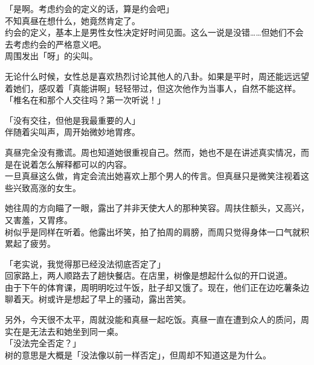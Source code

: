 「是啊。考虑约会的定义的话，算是约会吧」\\

不知真昼在想什么，她竟然肯定了。\\

约会的定义，基本上是男性女性决定好时间见面。这么一说是没错……但她们不会去考虑约会的严格意义吧。\\

周围发出「呀」的尖叫。

无论什么时候，女性总是喜欢热烈讨论其他人的八卦。如果是平时，周还能远远望着她们，感叹着「真能讲啊」轻轻带过，但这次他作为当事人，自然不能这样。\\

「椎名在和那个人交往吗？第一次听说！」

「没有交往，但他是我最重要的人」\\

伴随着尖叫声，周开始微妙地胃疼。

真昼完全没有撒谎。周也知道她很重视自己。然而，她也不是在讲述真实情况，而是在说着怎么解释都可以的内容。\\

一旦真昼这么做，肯定会流出她喜欢上那个男人的传言。但真昼只是微笑注视着这些兴致高涨的女生。

她往周的方向瞄了一眼，露出了并非天使大人的那种笑容。周扶住额头，又高兴，又害羞，又胃疼。\\

树似乎是同样在听着。他露出坏笑，拍了拍周的肩膀，而周只觉得身体一口气就积累起了疲劳。\\

\vspace{2\baselineskip}

「老实说，我觉得那已经没法彻底否定了」\\

回家路上，两人顺路去了趟快餐店。在店里，树像是想起什么似的开口说道。\\

由于下午的体育课，周明明吃过午饭，肚子却又饿了。现在，他们正在边吃薯条边聊着天。树或许是想起了早上的骚动，露出苦笑。

另外，今天很不太平，周就没能和真昼一起吃饭。真昼一直在遭到众人的质问，周实在是无法去和她坐到同一桌。\\

「没法完全否定？」\\

树的意思是大概是「没法像以前一样否定」，但周却不知道这是为什么。\\

